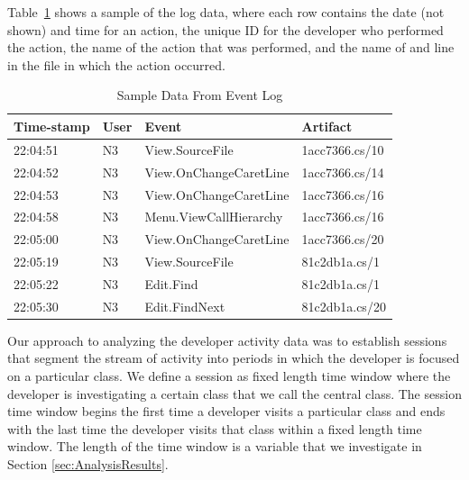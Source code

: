 Table~\ref{fig:SampleEventData} shows a sample of the log data, where each row contains the date (not shown) and time for an action, the unique ID for the developer who performed the action, the name of the action that was performed, and the name of and line in the file in which the action occurred.

\begin{table}[!t]
    \renewcommand{\arraystretch}{1.3}
    \centering
    \caption{Sample Data From Event Log}
    \begin{tabular}{llll}
        \toprule
        \textbf{Time-stamp} & \textbf{User} & \textbf{Event} & \textbf{Artifact} \\
        \midrule
        22:04:51 & N3 & View.SourceFile & 1acc7366.cs/10 \\
        22:04:52 & N3 & View.OnChangeCaretLine & 1acc7366.cs/14 \\
        22:04:53 & N3 & View.OnChangeCaretLine & 1acc7366.cs/16 \\
        22:04:58 & N3 & Menu.ViewCallHierarchy & 1acc7366.cs/16 \\
        22:05:00 & N3 & View.OnChangeCaretLine & 1acc7366.cs/20 \\
        22:05:19 & N3 & View.SourceFile & 81c2db1a.cs/1 \\
        22:05:22 & N3 & Edit.Find & 81c2db1a.cs/1 \\
        22:05:30 & N3 & Edit.FindNext & 81c2db1a.cs/20 \\
        \bottomrule
    \end{tabular}
    \label{fig:SampleEventData}
\end{table}

Our approach to analyzing the developer activity data was to establish sessions that segment the stream of activity into periods in which the developer is focused on a particular class. We define a session as fixed length time window where the developer is investigating a certain class that we call the central class.  The session time window begins the first time a developer visits a particular class and ends with the last time the developer visits that class within a fixed length time window. The length of the time window is a variable that we investigate in Section \ref{sec:AnalysisResults}.  

